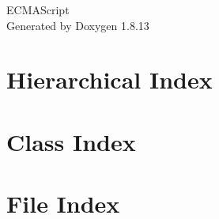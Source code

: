 \documentclass[twoside]{book}
\newcommand{\+}{\discretionary{\mbox{\scriptsize$\hookleftarrow$}}{}{}}
\newcommand{\clearemptydoublepage}{%
  \newpage{\pagestyle{empty}\cleardoublepage}%
}
\begin{document}
\hypersetup{pageanchor=false,
             bookmarksnumbered=true,
             pdfencoding=unicode
            }
\begin{titlepage}
\vspace*{7cm}
\begin{center}%
{\Large E\+C\+M\+A\+Script }\\
\vspace*{1cm}
{\large Generated by Doxygen 1.8.13}\\
\end{center}
\end{titlepage}
\clearemptydoublepage
{}
\tableofcontents
\clearemptydoublepage
{}
\hypersetup{pageanchor=true}

\chapter{Hierarchical Index}

\chapter{Class Index}

\chapter{File Index}

\end{document}

